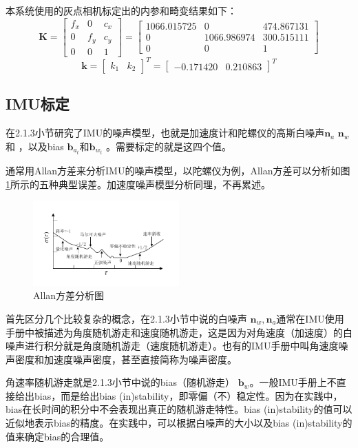 本系统使用的灰点相机标定出的内参和畸变结果如下：
\[
\bm{K}=
\left[\begin{array}{ccc}
{f_x} & {0}   & {c_x} \\
{0}   & {f_y} & {c_y} \\
{0}   & {0}   & {1}
\end{array}\right]
=
\left[\begin{array}{ccc}
{1066.015725} & {0}   & {474.867131} \\
{0}   & {1066.986974} & {300.515111} \\
{0}   & {0}   & {1}
\end{array}\right]
\]
\[
\bm{k} =
\left[\begin{array}{cc}
{k_1} & {k_2}   
\end{array}\right]^T
=
\left[\begin{array}{cc}
{-0.171420} & {0.210863}   
\end{array}\right]^T
\]
\subsection{IMU标定}
\label{chap:2.2.2}
在2.1.3小节研究了IMU的噪声模型，也就是加速度计和陀螺仪的高斯白噪声$\mathbf{n}_a $ $\mathbf{n}_w $和 ，以及bias  $\mathbf{b}_{a_t} $和$\mathbf{b}_{w_t} $ 。需要标定的就是这四个值。

通常用Allan方差来分析IMU的噪声模型，以陀螺仪为例，Allan方差可以分析如图\ref{fig2_12}所示的五种典型误差。加速度噪声模型分析同理，不再累述。
\begin{figure}[h]\setlength{\belowcaptionskip}{-12pt}
	\centering
	\includegraphics[width=0.5\textwidth]{figures/chapter2/fig2_12}
	\caption{Allan方差分析图}\label{fig2_12}
\end{figure}

首先区分几个比较复杂的概念，在2.1.3小节中说的白噪声 $\mathbf{n}_w, \mathbf{n}_a $通常在IMU使用手册中被描述为角度随机游走和速度随机游走，这是因为对角速度（加速度）的白噪声进行积分就是角度随机游走（速度随机游走）。也有的IMU手册中叫角速度噪声密度和加速度噪声密度，甚至直接简称为噪声密度。

角速率随机游走就是2.1.3小节中说的bias（随机游走） $\mathbf{b}_{w} $。一般IMU手册上不直接给出bias，而是给出bias (in)stability，即零偏（不）稳定性。因为在实践中，bias在长时间的积分中不会表现出真正的随机游走特性。bias (in)stability的值可以近似地表示bias的精度。在实践中，可以根据白噪声的大小以及bias (in)stability的值来确定bias的合理值。

